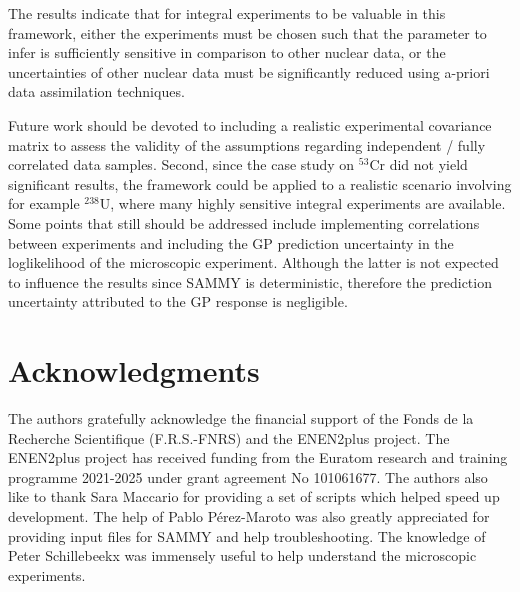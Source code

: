 \documentclass[preprint,review,12pt]{elsarticle}
\newcommand{\nuclide}[2]{$^{#1}$#2}
\begin{document}
The results indicate that for integral experiments to be valuable in this framework, either the experiments must be chosen such that the parameter to infer is sufficiently sensitive in comparison to other nuclear data, or the uncertainties of other nuclear data must be significantly reduced using a-priori data assimilation techniques.  

Future work should be devoted to including a realistic experimental covariance matrix to assess the validity of the assumptions regarding independent / fully correlated data samples. Second, since the case study on \nuclide{53}{Cr} did not yield significant results, the framework could be applied to a realistic scenario involving for example \nuclide{238}{U}, where many highly sensitive integral experiments are available. Some points that still should be addressed include implementing correlations between experiments and including the GP prediction uncertainty in the loglikelihood of the microscopic experiment. Although the latter is not expected to influence the results since SAMMY is deterministic, therefore the prediction uncertainty attributed to the GP response is negligible.

\section{Acknowledgments}
The authors gratefully acknowledge the financial support of the Fonds de la Recherche Scientifique (F.R.S.-FNRS) and the ENEN2plus project. The ENEN2plus project has received funding from the Euratom research and training programme 2021-2025 under grant agreement No 101061677. The authors also like to thank Sara Maccario for providing a set of scripts which helped speed up development. The help of Pablo Pérez-Maroto was also greatly appreciated for providing input files for SAMMY and help troubleshooting. The knowledge of Peter Schillebeekx was immensely useful to help understand the microscopic experiments. 

 

\end{document}
